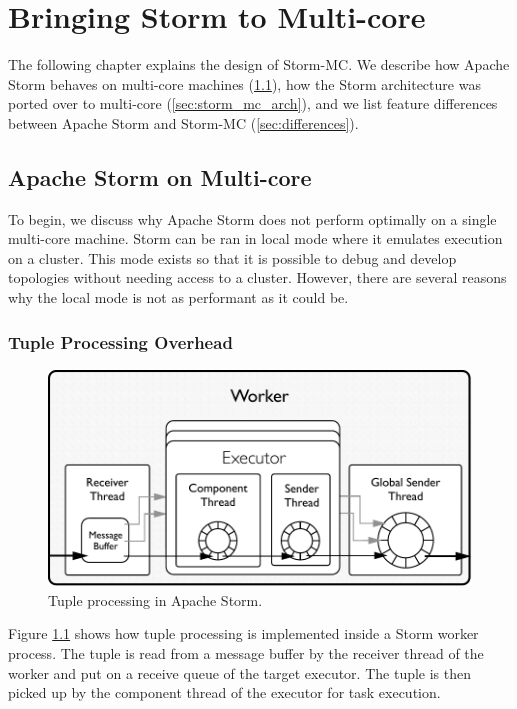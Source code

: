 \chapter{Bringing Storm to Multi-core}

The following chapter explains the design of Storm-MC. We describe how Apache Storm behaves on multi-core machines (\ref{sec:storm_on_mc}), how the Storm architecture was ported over to multi-core (\ref{sec:storm_mc_arch}), and we list feature differences between Apache Storm and Storm-MC (\ref{sec:differences}).

\section{Apache Storm on Multi-core}
\label{sec:storm_on_mc}

To begin, we discuss why Apache Storm does not perform optimally on a single multi-core machine. Storm can be ran in local mode where it emulates execution on a cluster. This mode exists so that it is possible to debug and develop topologies without needing access to a cluster. However, there are several reasons why the local mode is not as performant as it could be.

\subsection{Tuple Processing Overhead}

\begin{figure}[!htb]
	\centering
	\includegraphics[scale=0.7]{pdf/worker_inside.pdf}
	\caption{Tuple processing in Apache Storm.}
	\label{fig:worker_inside}
\end{figure}

Figure \ref{fig:worker_inside} shows how tuple processing is implemented inside a Storm worker process. The tuple is read from a message buffer by the receiver thread of the worker and put on a receive queue of the target executor. The tuple is then picked up by the component thread of the executor for task execution.

